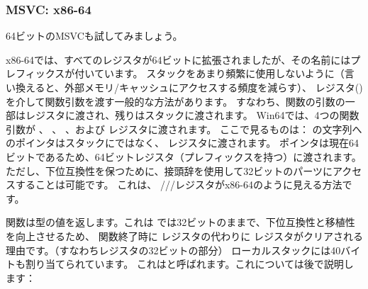 \subsubsection{MSVC: x86-64}

64ビットのMSVCも試してみましょう。




x86-64では、すべてのレジスタが64ビットに拡張されましたが、その名前にはプレフィックスが付いています。 
スタックをあまり頻繁に使用しないように（言い換えると、外部メモリ/キャッシュにアクセスする頻度を減らす）、
レジスタ() を介して関数引数を渡す一般的な方法があります。 
すなわち、関数の引数の一部はレジスタに渡され、残りはスタックに渡されます。 
Win64では、4つの関数引数が \RCX 、 \RDX 、  、および  レジスタに渡されます。 
ここで見るものは： \printf の文字列へのポインタはスタックにではなく、 \RCX レジスタに渡されます。 
ポインタは現在64ビットであるため、64ビットレジスタ（プレフィックスを持つ）に渡されます。 
ただし、下位互換性を保つために、接頭辞を使用して32ビットのパーツにアクセスすることは可能です。 
これは、 \RAX/\EAX/\AX/\AL レジスタがx86-64のように見える方法です。


\main 関数は\Tint{}型の値を返します。これは \CCpp では32ビットのままで、下位互換性と移植性を向上させるため、
関数終了時に \RAX レジスタの代わりに \EAX レジスタがクリアされる理由です。（すなわちレジスタの32ビットの部分） 
ローカルスタックには40バイトも割り当てられています。 
これはと呼ばれます。これについては後で説明します：
